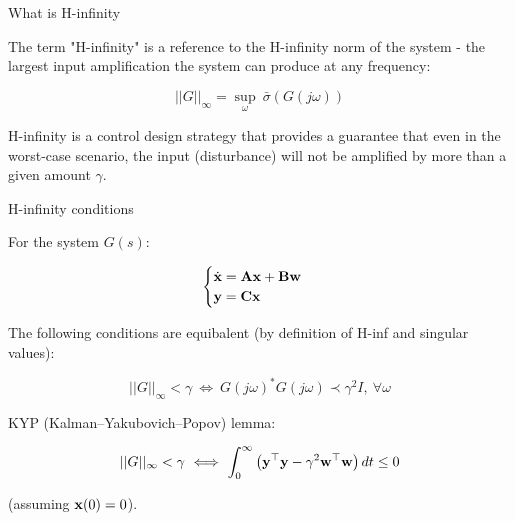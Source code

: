 \documentclass{beamer}
\begin{document}
	\begin{frame}{What is H-infinity}
		\begin{flushleft}
			
			
			The term "H-infinity" is a reference to the H-infinity norm of the system - the largest input amplification the system can produce at any frequency:
			
			\begin{equation}
				||G||_{\infty} = \underset{\omega}{\sup} \ \bar{\sigma} (G(j \omega))
			\end{equation}
			
			H-infinity is a control design strategy that provides a guarantee that even in the worst-case scenario, the input (disturbance) will not be amplified by more than a given amount $\gamma$.
			
		\end{flushleft}
	\end{frame}
	
	
	
	\begin{frame}{H-infinity conditions}
		\begin{flushleft}
			
			For the system $G(s)$:

			\begin{equation}
				\begin{cases}
					\dot{\mathbf{x}} = \mathbf{A}\mathbf{x}+\mathbf{B}\mathbf{w}
					\\
					\mathbf{y} = \mathbf{C}\mathbf{x}
				\end{cases}
			\end{equation}

		The following conditions are equibalent (by definition of H-inf and singular values):
		
		\begin{equation}
			||G||_\infty < \gamma \ \Longleftrightarrow \ G(j\omega)^* G(j\omega) \prec \gamma^2 I, \ \forall \omega
		\end{equation}
		
		KYP (Kalman–Yakubovich–Popov) lemma:
		
		\begin{equation}
			||G||_\infty < \gamma \ \Longleftrightarrow \ \int_0^\infty \left(\bo{y}\T \bo{y} - \gamma^2 \bo{w}\T \bo{w} \right) dt \leq 0
		\end{equation}
		
		\textcolor{mygray}{(assuming $\mathbf{x}(0) = 0$).}
			
		\end{flushleft}
	\end{frame}
	
\end{document}
